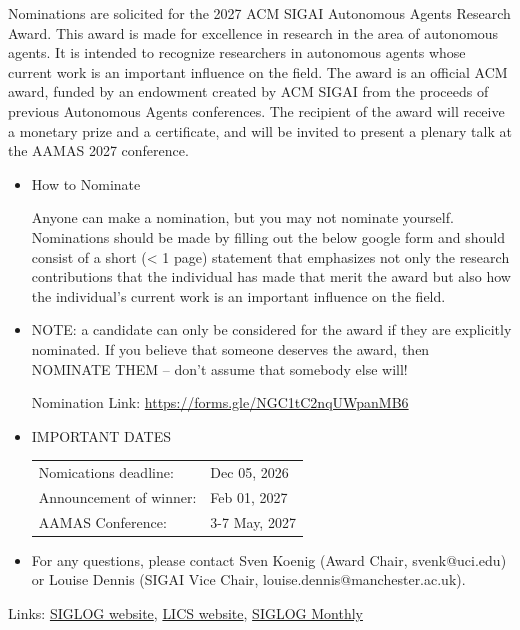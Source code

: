 \documentclass[prodmode,acmtecs]{acmsmall} %
\begin{document}
  Nominations are solicited for the 2027 ACM SIGAI Autonomous Agents Research Award. This award is made for excellence in research in the area of autonomous agents. It is intended to recognize researchers in autonomous agents whose current work is an important influence on the field. The award is an official ACM award, funded by an endowment created by ACM SIGAI from the proceeds of previous Autonomous Agents conferences. The recipient of the award will receive a monetary prize and a certificate, and will be invited to present a plenary talk at the AAMAS 2027 conference.\\ 
\begin{itemize}\item  How to Nominate 
 
  Anyone can make a nomination, but you may not nominate yourself. Nominations should be made by filling out the below google form and should consist of a short (< 1 page) statement that emphasizes not only the research contributions that the individual has made that merit the award but also how the individual’s current work is an important influence on the field. 
 
\item  NOTE: a candidate can only be considered for the award if they are explicitly nominated. If you believe that someone deserves the award, then NOMINATE THEM -- don't assume that somebody else will!  
 
  Nomination Link: \href{https://forms.gle/NGC1tC2nqUWpanMB6}{https://forms.gle/NGC1tC2nqUWpanMB6} 
 
\item  IMPORTANT DATES 
 
\begin{tabulary}{\linewidth}{LL}Nomications deadline:  & Dec 05, 2026 \\
Announcement of winner:  & Feb 01, 2027 \\
AAMAS Conference:  & 3-7 May, 2027 \\
\end{tabulary}
 
\item  For any questions, please contact Sven Koenig (Award Chair, svenk@uci.edu) or Louise Dennis (SIGAI Vice Chair, louise.dennis@manchester.ac.uk). 
 
\end{itemize}


\bigskip Links: \href{http://siglog.org/}{SIGLOG website}, \href{https://lics.siglog.org}{LICS website}, \href{https://lics.siglog.org/newsletters/}{SIGLOG Monthly}
\end{document}
